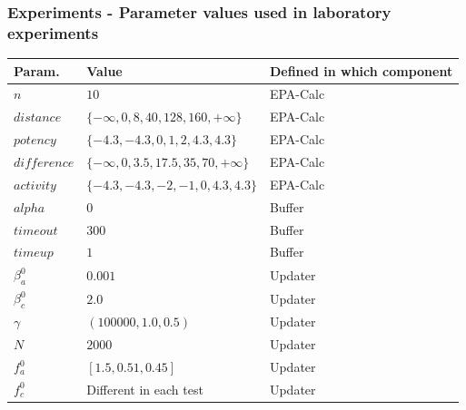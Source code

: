 \documentclass{beamer}
\begin{document}
\begin{frame}
\frametitle{Experiments - Parameter values used in laboratory experiments}
\begin{table}
\small
\centering
\begin{tabular}{| l | l | l |}
\hline
\textbf{Param.} & \textbf{Value} & \textbf{Defined in which component} \\ \hline
$n$ & $10$ & EPA-Calc \\ \hline
$distance$ & $\{-\infty, 0, 8, 40, 128, 160, +\infty\}$ & EPA-Calc \\ \hline
$potency$ & $\{-4.3, -4.3, 0, 1, 2, 4.3, 4.3\}$ & EPA-Calc  \\ \hline 
$difference$ & $\{-\infty, 0, 3.5, 17.5, 35, 70, +\infty\}$ & EPA-Calc \\ \hline
$activity$ & $\{-4.3, -4.3, -2, -1, 0, 4.3, 4.3\}$ & EPA-Calc\\ \hline
$alpha$ & $0$ & Buffer \\ \hline
$timeout$ & $300$ & Buffer \\ \hline
$timeup$ & $1$ & Buffer \\ \hline
$\beta_{a}^{0}$ & $0.001$ & Updater \\ \hline
$\beta_{c}^{0}$ & $2.0$ & Updater \\ \hline
$\gamma$ & $(100000, 1.0, 0.5)$ & Updater\\ \hline
$N$ & $2000$ & Updater \\ \hline
$f_a^{0}$ & $[1.5, 0.51, 0.45]$ & Updater \\ \hline
$f_c^{0}$ & Different in each test &Updater \\ \hline
\end{tabular}
\end{table}
\end{frame}
\end{document}
